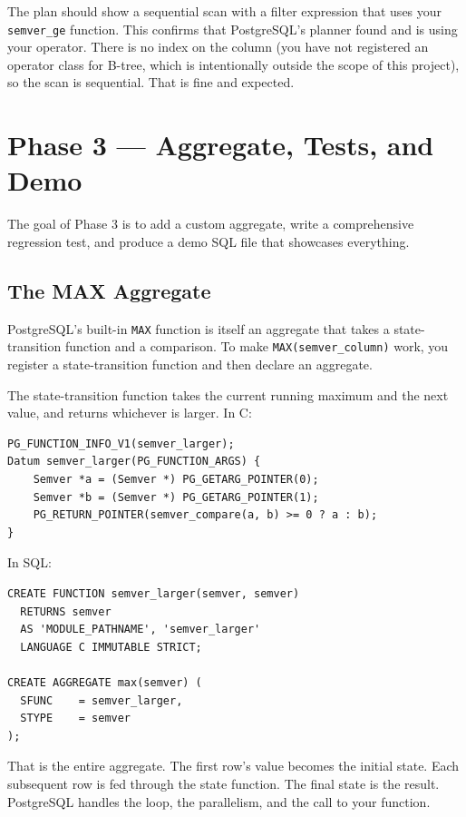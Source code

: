 \documentclass[11pt,a4paper]{article}
\begin{document}
The plan should show a sequential scan with a filter expression that uses your \texttt{semver\_ge} function. This confirms that PostgreSQL's planner found and is using your operator. There is no index on the column (you have not registered an operator class for B-tree, which is intentionally outside the scope of this project), so the scan is sequential. That is fine and expected.

\section{Phase 3 --- Aggregate, Tests, and Demo}

The goal of Phase 3 is to add a custom aggregate, write a comprehensive regression test, and produce a demo SQL file that showcases everything.

\subsection{The MAX Aggregate}
PostgreSQL's built-in \texttt{MAX} function is itself an aggregate that takes a state-transition function and a comparison. To make \texttt{MAX(semver\_column)} work, you register a state-transition function and then declare an aggregate.

The state-transition function takes the current running maximum and the next value, and returns whichever is larger. In C:

\begin{codebox}
\begin{lstlisting}
PG_FUNCTION_INFO_V1(semver_larger);
Datum semver_larger(PG_FUNCTION_ARGS) {
    Semver *a = (Semver *) PG_GETARG_POINTER(0);
    Semver *b = (Semver *) PG_GETARG_POINTER(1);
    PG_RETURN_POINTER(semver_compare(a, b) >= 0 ? a : b);
}
\end{lstlisting}
\end{codebox}

In SQL:

\begin{codebox}
\begin{lstlisting}
CREATE FUNCTION semver_larger(semver, semver)
  RETURNS semver
  AS 'MODULE_PATHNAME', 'semver_larger'
  LANGUAGE C IMMUTABLE STRICT;

CREATE AGGREGATE max(semver) (
  SFUNC    = semver_larger,
  STYPE    = semver
);
\end{lstlisting}
\end{codebox}

That is the entire aggregate. The first row's value becomes the initial state. Each subsequent row is fed through the state function. The final state is the result. PostgreSQL handles the loop, the parallelism, and the call to your function.
\end{document}
